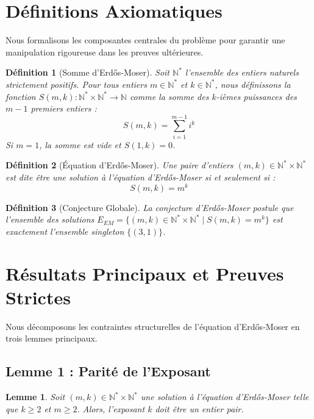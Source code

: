 \documentclass[11pt,a4paper]{article}
\newtheorem{lemma}{Lemme}
\newtheorem{definition}{Définition}
\begin{document}
\section{Définitions Axiomatiques}
Nous formalisons les composantes centrales du problème pour garantir une manipulation rigoureuse dans les preuves ultérieures.

\begin{definition}[Somme d'Erd\H{o}s-Moser]
Soit $\mathbb{N}^*$ l'ensemble des entiers naturels strictement positifs.
Pour tous entiers $m \in \mathbb{N}^*$ et $k \in \mathbb{N}^*$, nous définissons la fonction $S(m, k) : \mathbb{N}^* \times \mathbb{N}^* \to \mathbb{N}$ comme la somme des $k$-ièmes puissances des $m-1$ premiers entiers :
$$S(m, k) = \sum_{i=1}^{m-1} i^k$$
Si $m=1$, la somme est vide et $S(1, k) = 0$.
\end{definition}

\begin{definition}[Équation d'Erd\H{o}s-Moser]
Une paire d'entiers $(m, k) \in \mathbb{N}^* \times \mathbb{N}^*$ est dite être une solution à l'équation d'Erd\H{o}s-Moser si et seulement si :
$$S(m, k) = m^k$$
\end{definition}

\begin{definition}[Conjecture Globale]
La conjecture d'Erd\H{o}s-Moser postule que l'ensemble des solutions $E_{EM} = \{ (m, k) \in \mathbb{N}^* \times \mathbb{N}^* \mid S(m, k) = m^k \}$ est exactement l'ensemble singleton $\{(3, 1)\}$.
\end{definition}

\section{Résultats Principaux et Preuves Strictes}
Nous décomposons les contraintes structurelles de l'équation d'Erd\H{o}s-Moser en trois lemmes principaux.

\subsection{Lemme 1 : Parité de l'Exposant}

\begin{lemma}
Soit $(m, k) \in \mathbb{N}^* \times \mathbb{N}^*$ une solution à l'équation d'Erd\H{o}s-Moser telle que $k \ge 2$ et $m \ge 2$. Alors, l'exposant $k$ doit être un entier pair.
\end{lemma}
\end{document}
